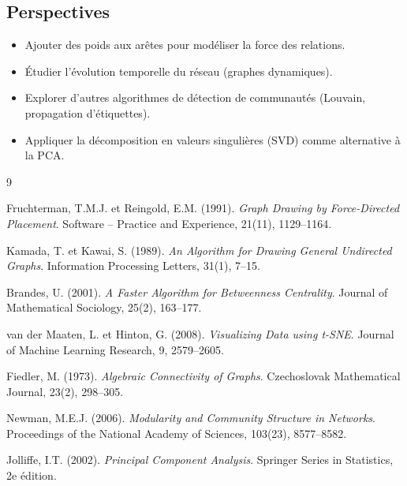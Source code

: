 \documentclass[12pt,a4paper]{article}
\begin{document}
\subsection*{Perspectives}

\begin{itemize}
    \item Ajouter des poids aux arêtes pour modéliser la force des relations.
    \item Étudier l'évolution temporelle du réseau (graphes dynamiques).
    \item Explorer d'autres algorithmes de détection de communautés (Louvain, propagation d'étiquettes).
    \item Appliquer la décomposition en valeurs singulières (SVD) comme alternative à la PCA.
\end{itemize}

\begin{thebibliography}{9}

Fruchterman, T.M.J. et Reingold, E.M. (1991). \emph{Graph Drawing by Force-Directed Placement}. Software -- Practice and Experience, 21(11), 1129--1164.

Kamada, T. et Kawai, S. (1989). \emph{An Algorithm for Drawing General Undirected Graphs}. Information Processing Letters, 31(1), 7--15.

Brandes, U. (2001). \emph{A Faster Algorithm for Betweenness Centrality}. Journal of Mathematical Sociology, 25(2), 163--177.

van der Maaten, L. et Hinton, G. (2008). \emph{Visualizing Data using t-SNE}. Journal of Machine Learning Research, 9, 2579--2605.

Fiedler, M. (1973). \emph{Algebraic Connectivity of Graphs}. Czechoslovak Mathematical Journal, 23(2), 298--305.

Newman, M.E.J. (2006). \emph{Modularity and Community Structure in Networks}. Proceedings of the National Academy of Sciences, 103(23), 8577--8582.

Jolliffe, I.T. (2002). \emph{Principal Component Analysis}. Springer Series in Statistics, 2e édition.

\end{thebibliography}
\end{document}

